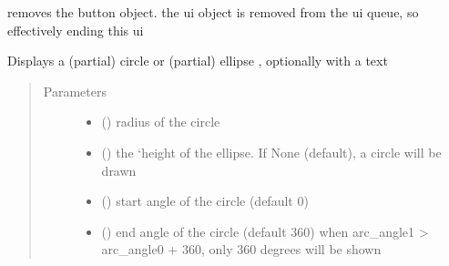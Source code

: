 \documentclass[letterpaper,10pt,english]{sphinxmanual}
\begin{document}
\begin{fulllineitems}
\begin{fulllineitems}
\label{\detokenize{Reference:salabim.AnimateButton.remove}}
removes the button object. 
the ui object is removed from the ui queue,
so effectively ending this ui

\end{fulllineitems}


\end{fulllineitems}


\begin{fulllineitems}
\label{\detokenize{Reference:salabim.AnimateCircle}}
Displays a (partial) circle or (partial) ellipse , optionally with a text
\begin{quote}\begin{description}
\item[{Parameters}] \leavevmode\begin{itemize}
\item {} 
 () \textendash{} radius of the circle

\item {} 
 () \textendash{} the ‘height of the ellipse. If None (default), a circle will be drawn

\item {} 
 () \textendash{} start angle of the circle (default 0)

\item {} 
 () \textendash{} end angle of the circle (default 360) 
when arc\_angle1 \textgreater{} arc\_angle0 + 360, only 360 degrees will be shown


\end{itemize}
\end{description}
\end{quote}
\end{fulllineitems}
\end{document}

